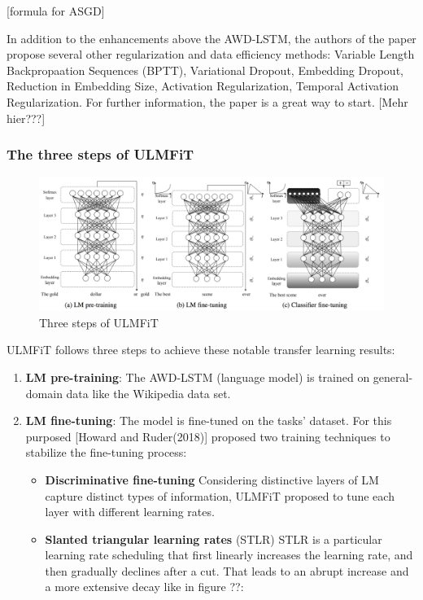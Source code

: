 \documentclass[]{krantz}
\providecommand{\tightlist}{%
  \setlength{\itemsep}{0pt}\setlength{\parskip}{0pt}}
\begin{document}
{[}formula for ASGD{]}

In addition to the enhancements above the AWD-LSTM, the authors of the paper propose several other regularization and data efficiency methods: Variable Length Backpropaation Sequences (BPTT), Variational Dropout, Embedding Dropout, Reduction in Embedding Size, Activation Regularization, Temporal Activation Regularization. For further information, the paper is a great way to start. {[}Mehr hier???{]}

\hypertarget{the-three-steps-of-ulmfit}{%
\subsubsection{The three steps of ULMFiT}\label{the-three-steps-of-ulmfit}}

\begin{figure}

{\centering \includegraphics[width=1\linewidth]{figures/02-01-transfer-learning-for-nlp-1/ulmfit-overview} 

}

\caption{Three steps of ULMFiT}\label{fig:ch21-figure03}
\end{figure}

ULMFiT follows three steps to achieve these notable transfer learning results:

\begin{enumerate}
\def\labelenumi{\arabic{enumi}.}
\item
  \textbf{LM pre-training}: The AWD-LSTM (language model) is trained on general-domain data like the Wikipedia data set.
\item
  \textbf{LM fine-tuning}: The model is fine-tuned on the tasks' dataset. For this purposed {[}Howard and Ruder(2018){]} proposed two training techniques to stabilize the fine-tuning process:

  \begin{itemize}
  \tightlist
  \item
    \textbf{Discriminative fine-tuning}
    Considering distinctive layers of LM capture distinct types of information, ULMFiT proposed to tune each layer with different learning rates.
  \item
    \textbf{Slanted triangular learning rates} (STLR)
    STLR is a particular learning rate scheduling that first linearly increases the learning rate, and then gradually declines after a cut. That leads to an abrupt increase and a more extensive decay like in figure ??:
  \end{itemize}
\end{enumerate}
\end{document}

